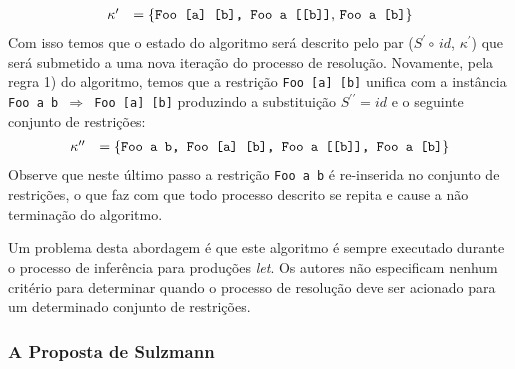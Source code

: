 \begin{equation*}
	\begin{array}{ll}
		\kappa^{\prime} & = \{\text{\texttt{Foo [a] [b], Foo a [[b]]}}\text{, \texttt{Foo a [b]}}\}
	\end{array}
\end{equation*}
Com isso temos que o estado do algoritmo ser\'a descrito pelo par ($S^{\prime}\circ\,id$, $\kappa^{\prime}$) que ser\'a
submetido a uma nova itera\c{c}\~ao do processo de resolu\c{c}\~ao. 
Novamente, pela regra 1) do algoritmo, temos que a restri\c{c}\~ao 
\texttt{Foo [a] [b]} unifica com a inst\^ancia \texttt{Foo a b $\Rightarrow$ Foo [a] [b]} produzindo a substitui\c{c}\~ao
$S^{\prime\prime}=id$ e o seguinte conjunto de restri\c{c}\~oes:
\begin{equation*}
	\begin{array}{ll}
		\kappa^{\prime\prime} & = \{\text{\texttt{Foo a b, Foo [a] [b], Foo a [[b]], Foo a [b]}}\}
	\end{array}
\end{equation*}
Observe que neste \'ultimo passo a restri\c{c}\~ao \texttt{Foo a b} \'e re-inserida no conjunto de restri\c{c}\~oes, o 
que faz com que todo processo descrito se repita e cause a n\~ao termina\c{c}\~ao do algoritmo. 

Um problema desta 
abordagem \'e que este algoritmo \'e sempre executado durante o processo de infer\^encia para produ\c{c}\~oes 
\emph{let}. Os autores n\~ao especificam nenhum crit\'erio para determinar quando
o processo de resolu\c{c}\~ao deve ser acionado para um determinado conjunto de restri\c{c}\~oes. 


\subsubsection{A Proposta de Sulzmann}

